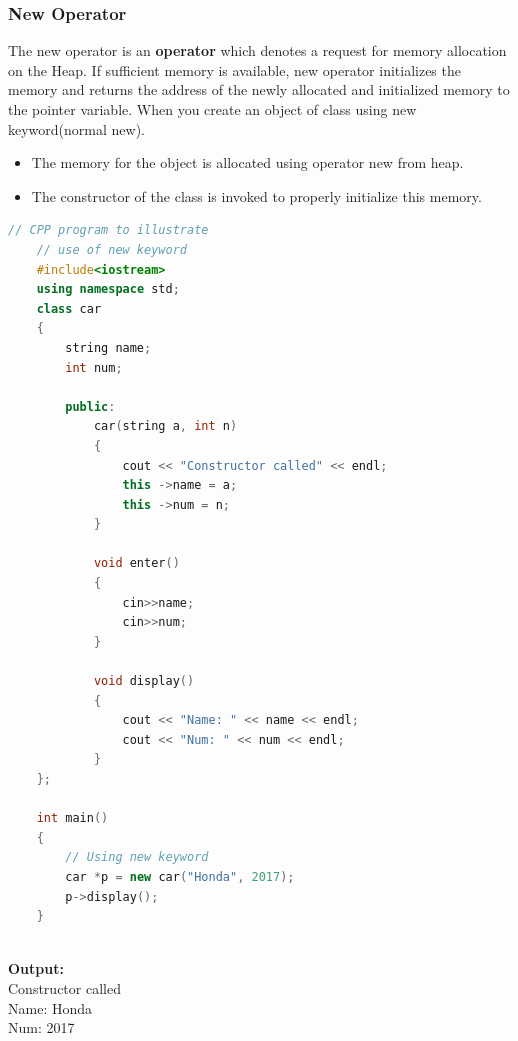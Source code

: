 \documentclass[12pt , a4paper]{article}
\begin{document}
	\subsubsection{New Operator}
	The new operator is an \textbf{operator} which denotes a request for memory allocation on the Heap. If sufficient memory is available, new operator initializes the memory and returns the address of the newly allocated and initialized memory to the pointer variable. When you create an object of class using new keyword(normal new).
	\begin{itemize}
		\item The memory for the object is allocated using operator new from heap.\\
		\item The constructor of the class is invoked to properly initialize this memory.\\
	\end{itemize}
	\begin{lstlisting}[language=C++]
	// CPP program to illustrate
	// use of new keyword
	#include<iostream>
	using namespace std;
	class car
	{
		string name;
		int num;
	
		public:
			car(string a, int n)
			{
				cout << "Constructor called" << endl;
				this ->name = a;
				this ->num = n;
			}
	
			void enter()
			{
				cin>>name;
				cin>>num;
			}
	
			void display()
			{
				cout << "Name: " << name << endl;
				cout << "Num: " << num << endl;
			}
	};
	
	int main()
	{
		// Using new keyword
		car *p = new car("Honda", 2017);
		p->display();
	}
		
	\end{lstlisting}

	\begin{tcolorbox}
	\textbf{Output:}\\
	Constructor called\\
	Name: Honda\\
	Num: 2017
	\end{tcolorbox}
\end{document}
